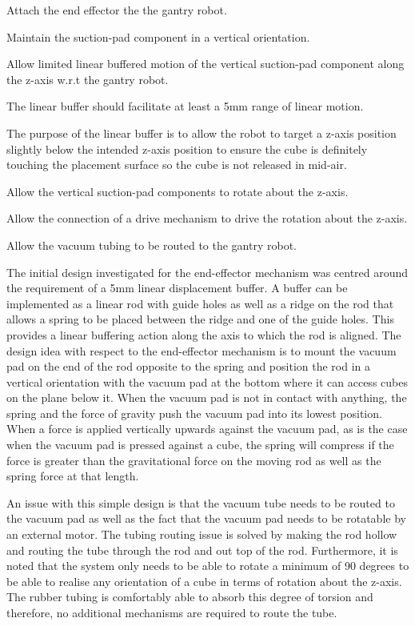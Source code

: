 \begin{compactitem}
	\item Attach the end effector the the gantry robot.
	\item Maintain the suction-pad component in a vertical orientation.
	\item Allow limited linear buffered motion of the vertical suction-pad component along the z-axis w.r.t the gantry robot.
	\item The linear buffer should facilitate at least a 5mm range of linear motion.
	\item The purpose of the linear buffer is to allow the robot to target a z-axis position slightly below the intended z-axis position to ensure the cube is definitely touching the placement surface so the cube is not released in mid-air.
	\item Allow the vertical suction-pad components to rotate about the z-axis.
	\item Allow the connection of a drive mechanism to drive the rotation about the z-axis.
	\item Allow the vacuum tubing to be routed to the gantry robot.
\end{compactitem}

The initial design investigated for the end-effector mechanism was centred around the requirement of a 5mm linear displacement buffer. A buffer can be implemented as a linear rod with guide holes as well as a ridge on the rod that allows a spring to be placed between the ridge and one of the guide holes. This provides a linear buffering action along the axis to which the rod is aligned. The design idea with respect to the end-effector mechanism is to mount the vacuum pad on the end of the rod opposite to the spring and position the rod in a vertical orientation with the vacuum pad at the bottom where it can access cubes on the plane below it. When the vacuum pad is not in contact with anything, the spring and the force of gravity push the vacuum pad into its lowest position. When a force is applied vertically upwards against the vacuum pad, as is the case when the vacuum pad is pressed against a cube, the spring will compress if the force is greater than the gravitational force on the moving rod as well as the spring force at that length.

An issue with this simple design is that the vacuum tube needs to be routed to the vacuum pad as well as the fact that the vacuum pad needs to be rotatable by an external motor. The tubing routing issue is solved by making the rod hollow and routing the tube through the rod and out top of the rod. Furthermore, it is noted that the system only needs to be able to rotate a minimum of 90 degrees to be able to realise any orientation of a cube in terms of rotation about the z-axis. The rubber tubing is comfortably able to absorb this degree of torsion and therefore, no additional mechanisms are required to route the tube.

